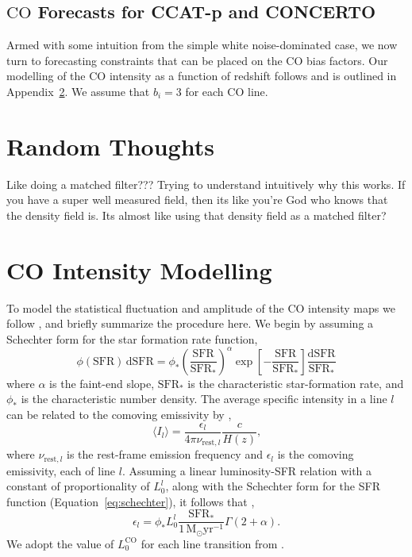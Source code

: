 \documentclass{aastex62}
\newcommand{\Msun}{\ensuremath{\text{M}_\odot}}
\newcommand{\SFR}{\ensuremath{\text{SFR}}}
\newcommand{\CO}{\ensuremath{\text{CO}}}
\newcommand{\beq}{\begin{equation}}
\newcommand{\eeq}{\end{equation}}
\newcommand{\avg}[1]{\ensuremath{\langle #1 \rangle}}
\begin{document}
\subsection{\CO{} Forecasts for CCAT-p and CONCERTO} \label{ssec:forecasts_tf}
Armed with some intuition from the simple white noise-dominated case, we now
turn to forecasting constraints that can be placed on the CO bias factors. Our
modelling of the \CO{} intensity as a function of redshift follows
\citet{2016ApJ...825..143L} and is outlined in Appendix~\ref{app:co_int}. We
assume that $b_i=3$ for each \CO{} line.



\section{Random Thoughts}
Like doing a matched filter??? Trying to understand intuitively why this
works. If you have a super well measured field, then its like you're God who
knows that the density field is. Its almost like using that density field as a
matched filter?

\appendix
\section{CO Intensity Modelling} \label{app:co_int}
To model the statistical fluctuation and amplitude of the \CO{} intensity maps
we follow \citet{2016ApJ...825..143L}, and briefly summarize the procedure
here. We begin by assuming a Schechter form for the star formation rate
function,
\beq\label{eq:schechter}
\phi(\SFR)\,\text{d}\SFR = \phi_*
\left(\frac{\SFR}{\SFR_*}\right)^{\alpha}\exp{\left[-\frac{\SFR}{\SFR_*}\right]}
\frac{\text{d}\SFR}{\SFR_*}
\eeq
where $\alpha$ is the faint-end slope, $\SFR_*$ is the characteristic
star-formation rate, and $\phi_*$ is the characteristic number density. The
average specific intensity in a line $l$ can be related to the comoving
emissivity by \citep{2011ApJ...741...70L, 2013ApJ...768...15P},
\beq\label{eq:emiss_to_int}
\avg{I_l} = \frac{\epsilon_l}{4\pi \nu_{\text{rest},l}}\frac{c}{H(z)}\text{,}
\eeq
where $\nu_{\text{rest},l}$ is the rest-frame emission frequency and
$\epsilon_l$ is the comoving emissivity, each of line $l$. Assuming a linear
luminosity-SFR relation with a constant of proportionality of $L_0^l$, along
with the Schechter form for the SFR function (Equation~\ref{eq:schechter}), it
follows that \citep{2013ApJ...768...15P},
\beq\label{eq:com_emiss}
\epsilon_l = \phi_* L_0^{l}
\frac{\SFR_*}{1\,\Msun\text{yr}^{-1}}\Gamma{(2+\alpha)}\text{.}
\eeq
We adopt the value of $L_0^{\CO}$ for each line transition from
\citet{2010JCAP...11..016V}.



\end{document}
